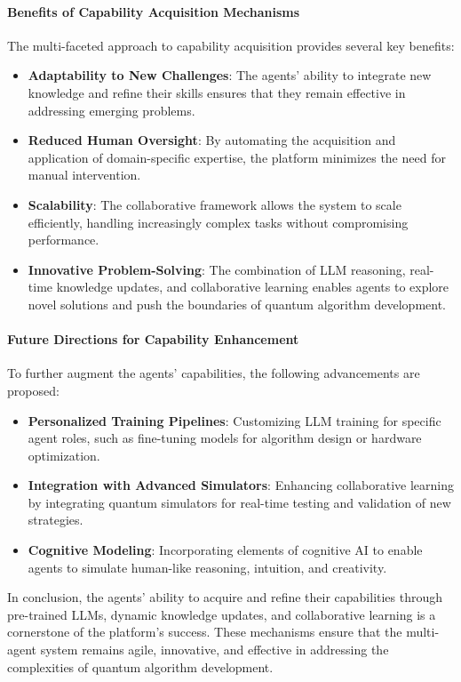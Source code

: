 \documentclass[12pt]{article}
\begin{document}
\paragraph{Benefits of Capability Acquisition Mechanisms}
The multi-faceted approach to capability acquisition provides several key benefits:
\begin{itemize}
    \item \textbf{Adaptability to New Challenges}: The agents’ ability to integrate new knowledge and refine their skills ensures that they remain effective in addressing emerging problems.
    \item \textbf{Reduced Human Oversight}: By automating the acquisition and application of domain-specific expertise, the platform minimizes the need for manual intervention.
    \item \textbf{Scalability}: The collaborative framework allows the system to scale efficiently, handling increasingly complex tasks without compromising performance.
    \item \textbf{Innovative Problem-Solving}: The combination of LLM reasoning, real-time knowledge updates, and collaborative learning enables agents to explore novel solutions and push the boundaries of quantum algorithm development.
\end{itemize}

\paragraph{Future Directions for Capability Enhancement}
To further augment the agents’ capabilities, the following advancements are proposed:
\begin{itemize}
    \item \textbf{Personalized Training Pipelines}: Customizing LLM training for specific agent roles, such as fine-tuning models for algorithm design or hardware optimization.
    \item \textbf{Integration with Advanced Simulators}: Enhancing collaborative learning by integrating quantum simulators for real-time testing and validation of new strategies.
    \item \textbf{Cognitive Modeling}: Incorporating elements of cognitive AI to enable agents to simulate human-like reasoning, intuition, and creativity.
\end{itemize}

In conclusion, the agents’ ability to acquire and refine their capabilities through pre-trained LLMs, dynamic knowledge updates, and collaborative learning is a cornerstone of the platform’s success. These mechanisms ensure that the multi-agent system remains agile, innovative, and effective in addressing the complexities of quantum algorithm development.
\end{document}
